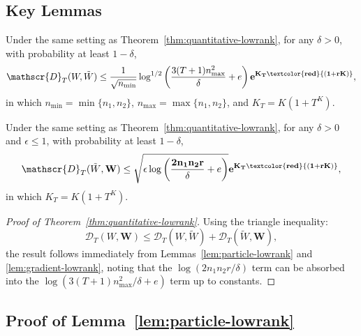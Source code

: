 \subsection{Key Lemmas}

\begin{lemma}
\label{lem:particle-lowrank}
Under the same setting as Theorem~\ref{thm:quantitative-lowrank}, for any $\delta > 0$, with probability at least $1-\delta$,
\[
\mathscr{D}_T(W, \tilde{W}) \le \frac{1}{\sqrt{n_{\min}}}\log^{1/2}\left(\frac{3(T+1)n_{\max}^2}{\delta} + e\right)\mathbf{e^{K_T\textcolor{red}{(1+rK)}}},
\]
in which $n_{\min} = \min\{n_1, n_2\}$, $n_{\max} = \max\{n_1, n_2\}$, and $K_T = K(1+T^K)$.
\end{lemma}

\begin{lemma}
\label{lem:gradient-lowrank}
Under the same setting as Theorem~\ref{thm:quantitative-lowrank}, for any $\delta > 0$ and $\epsilon \le 1$, with probability at least $1-\delta$,
\[
\mathscr{D}_T(\tilde{W}, \mathbf{W}) \le \sqrt{\epsilon\log\left(\frac{\mathbf{2n_1n_2r}}{\delta} + e\right)}\mathbf{e^{K_T\textcolor{red}{(1+rK)}}},
\]
in which $K_T = K(1+T^K)$.
\end{lemma}

\begin{proof}[Proof of Theorem~\ref{thm:quantitative-lowrank}]
Using the triangle inequality:
\[
\mathscr{D}_T(W, \mathbf{W}) \le \mathscr{D}_T(W, \tilde{W}) + \mathscr{D}_T(\tilde{W}, \mathbf{W}),
\]
the result follows immediately from Lemmas~\ref{lem:particle-lowrank} and \ref{lem:gradient-lowrank}, noting that the $\log(2n_1n_2r/\delta)$ term can be absorbed into the $\log(3(T+1)n_{\max}^2/\delta + e)$ term up to constants.
\end{proof}

\subsection{Proof of Lemma~\ref{lem:particle-lowrank}}

